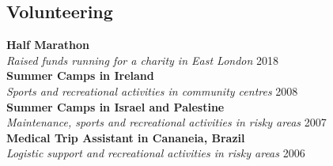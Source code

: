 \documentclass[margin]{res}
\begin{document}
\begin{resume}
\section{Volunteering}
\textbf{Half Marathon} \\ \textit{Raised funds running for a charity in East London} \hfill 2018 \\
\textbf{Summer Camps in Ireland} \\ \textit{Sports and recreational activities in community centres} \hfill 2008 \\
\textbf{Summer Camps in Israel and Palestine} \\ \textit{Maintenance, sports and recreational activities in risky areas} \hfill 2007 \\
\textbf{Medical Trip Assistant in Cananeia, Brazil} \\ \textit{Logistic support and recreational activities in risky areas} \hfill 2006 \\

\end{resume} 
\end{document}
